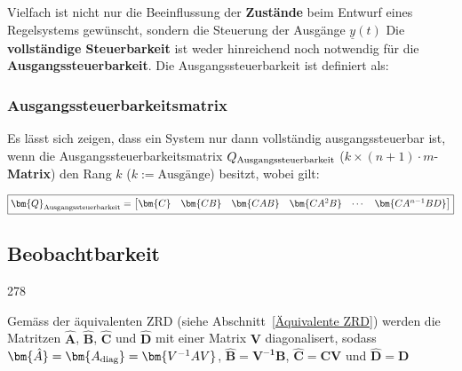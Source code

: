 Vielfach ist nicht nur die Beeinflussung der \textbf{Zustände} beim Entwurf eines Regelsystems gewünscht, sondern die 
Steuerung der Ausgänge $\underline{y}(t)$ Die \textbf{vollständige Steuerbarkeit} ist weder hinreichend noch notwendig
für die \textbf{Ausgangssteuerbarkeit}. Die Ausgangssteuerbarkeit ist definiert als: \\


\subsubsection{Ausgangssteuerbarkeitsmatrix}

Es lässt sich zeigen, dass ein System nur dann vollständig ausgangssteuerbar ist, wenn die Ausgangssteuerbarkeitsmatrix
$Q_{\rm Ausgangssteuerbarkeit}$ (\(k \times (n+1) \cdot m\)-\textbf{Matrix}) den Rang $k$ ($k := \text{Ausgänge}$) besitzt, wobei gilt:

$$ \boxed{\bm{Q}_{\rm Ausgangssteuerbarkeit} = 
\begin{bmatrix}
    \bm{C} & \bm{CB} & \bm{CAB} & \bm{CA^2B} & \cdots & \bm{C A^{n-1}BD}
\end{bmatrix} } $$

\subsection{Beobachtbarkeit}{278}

Gemäss der äquivalenten ZRD (siehe Abschnitt~\ref{Äquivalente ZRD}) werden die Matritzen $\bm{\hat{A}}$,
$\bm{\hat{B}}$, $\bm{\hat{C}}$ und $\bm{\hat{D}}$ mit einer Matrix $\bm{V}$ diagonalisert, sodass 
$\bm{\hat{A}} = \bm{A_{\rm diag}} = \bm{V^{-1} A V}$, $\bm{\hat{B}} = \bm{V^{-1} B}$, 
$\bm{\hat{C}} = \bm{C V}$ und $\bm{\hat{D}} = \bm{D}$

\vspace{0.2cm}

\vspace{0.2cm}


